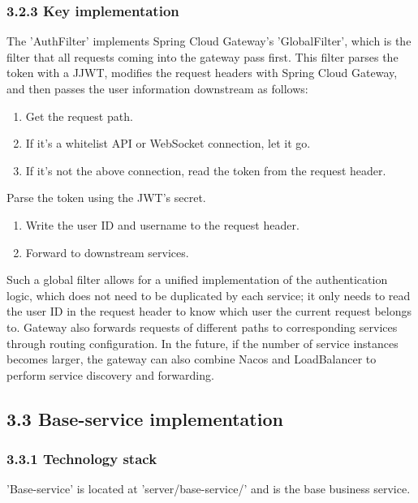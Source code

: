 \documentclass{article}
\begin{document}
\subsubsection{3.2.3 Key implementation}

The 'AuthFilter' implements Spring Cloud Gateway's 'GlobalFilter', which is the filter that all requests coming into the gateway pass first. This filter parses the token with a JJWT, modifies the request headers with Spring Cloud Gateway, and then passes the user information downstream as follows:

\begin{enumerate}
    \item Get the request path.
    \item If it's a whitelist API or WebSocket connection, let it go.
    \item If it's not the above connection, read the token from the request header.
\end{enumerate}

Parse the token using the JWT's secret.

\begin{enumerate}
    \item Write the user ID and username to the request header.
    \item Forward to downstream services.
\end{enumerate}

Such a global filter allows for a unified implementation of the authentication logic, which does not need to be duplicated by each service; it only needs to read the user ID in the request header to know which user the current request belongs to. Gateway also forwards requests of different paths to corresponding services through routing configuration. In the future, if the number of service instances becomes larger, the gateway can also combine Nacos and LoadBalancer to perform service discovery and forwarding.

\subsection{3.3 Base-service implementation}

\subsubsection{3.3.1 Technology stack}

'Base-service' is located at 'server/base-service/' and is the base business service.
\end{document}
